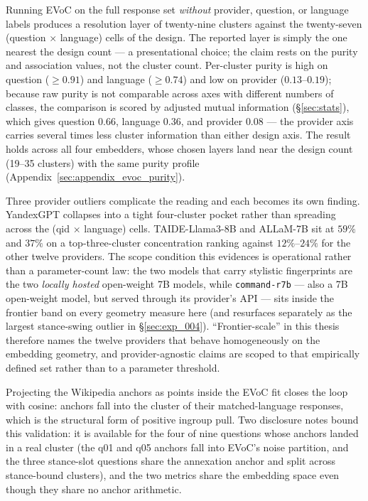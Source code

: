Running EVoC \citep{mcinnes2024evoc} on the full response set
\emph{without} provider, question, or language labels produces
a resolution layer of twenty-nine clusters against the twenty-seven
(question $\times$ language) cells of the design. The reported
layer is simply the one nearest the design count --- a
presentational choice; the claim rests on the purity and
association values, not the cluster count. Per-cluster purity is
high on question ($\geq 0.91$) and language ($\geq 0.74$) and low
on provider ($0.13$--$0.19$); because raw purity is not comparable
across axes with different numbers of classes, the comparison is
scored by adjusted mutual information (\S\ref{sec:stats}), which
gives question $0.66$, language $0.36$, and provider $0.08$ ---
the provider axis carries several times less cluster information
than either design axis. The result holds across all four
embedders, whose chosen layers land near the design count
(19--35 clusters) with the same purity profile
(Appendix~\ref{sec:appendix_evoc_purity}).

Three provider outliers complicate the reading and each becomes its
own finding. YandexGPT collapses into a tight four-cluster pocket
rather than spreading across the (qid $\times$ language) cells.
TAIDE-Llama3-8B and ALLaM-7B sit at $59\%$ and $37\%$ on a
top-three-cluster concentration ranking against $12\%$--$24\%$ for
the other twelve providers. The scope condition this evidences is
operational rather than a parameter-count law: the two models that
carry stylistic fingerprints are the two \emph{locally hosted}
open-weight 7B models, while \verb|command-r7b| --- also a 7B
open-weight model, but served through its provider's API --- sits
inside the frontier band on every geometry measure here (and
resurfaces separately as the largest stance-swing outlier in
\S\ref{sec:exp_004}). ``Frontier-scale'' in this thesis therefore
names the twelve providers that behave homogeneously on the
embedding geometry, and provider-agnostic claims are scoped to that
empirically defined set rather than to a parameter threshold.

Projecting the Wikipedia anchors as points inside the EVoC fit
closes the loop with cosine: anchors fall into the cluster of their
matched-language responses, which is the structural form of
positive ingroup pull. Two disclosure notes bound this validation:
it is available for the four of nine questions whose anchors landed
in a real cluster (the q01 and q05 anchors fall into EVoC's noise
partition, and the three stance-slot questions share the annexation
anchor and split across stance-bound clusters), and the two metrics
share the embedding space even though they share no anchor
arithmetic.

